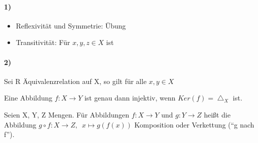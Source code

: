 \documentclass{../../meta/tudscript}
\begin{document}

\paragraph{1)}

\begin{itemize}

\item
  Reflexivität und Symmetrie: Übung
\item
  Transitivität: Für \(x,y,z \in X\) ist 
\end{itemize}

\paragraph{2)}

Sei R Äquivalenzrelation auf X, so gilt für alle \(x, y \in X\)


Eine Abbildung \(f: X \rightarrow Y\) ist genau dann injektiv, wenn
\(Ker(f) = \bigtriangleup_X\) ist.


Seien X, Y, Z Mengen. Für Abbildungen \(f: X \rightarrow Y\) und
\(g: Y \rightarrow Z\) heißt die Abbildung
\(g \circ f: X \rightarrow Z, \enspace x \mapsto g(f(x))\) Komposition
oder Verkettung (``g nach f'').
\end{document}
